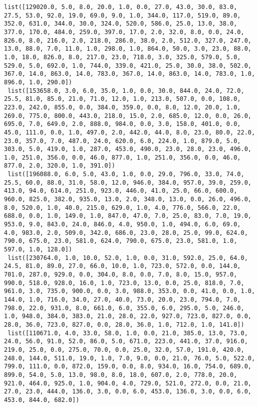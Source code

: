 \documentclass[11pt]{article}
\begin{document}
\begin{Verbatim}[commandchars=\\\{\}]
 list([129020.0, 5.0, 8.0, 20.0, 1.0, 0.0, 27.0, 43.0, 30.0, 83.0, 27.5, 53.0, 92.0, 19.0, 69.0, 9.0, 1.0, 344.0, 117.0, 519.0, 89.0, 352.0, 631.0, 344.0, 30.0, 324.0, 520.0, 586.0, 25.0, 13.0, 38.0, 377.0, 170.0, 484.0, 259.0, 397.0, 17.0, 2.0, 32.0, 8.0, 0.0, 24.0, 826.0, 8.0, 216.0, 2.0, 218.0, 286.0, 38.0, 2.0, 512.0, 327.0, 247.0, 13.0, 88.0, 7.0, 11.0, 1.0, 298.0, 1.0, 864.0, 50.0, 3.0, 23.0, 88.0, 1.0, 18.0, 826.0, 8.0, 217.0, 23.0, 718.0, 3.0, 325.0, 579.0, 5.0, 529.0, 5.0, 692.0, 1.0, 744.0, 339.0, 421.0, 25.0, 30.0, 38.0, 502.0, 367.0, 14.0, 863.0, 14.0, 783.0, 367.0, 14.0, 863.0, 14.0, 783.0, 1.0, 896.0, 1.0, 290.0])
 list([153658.0, 3.0, 6.0, 35.0, 1.0, 0.0, 30.0, 844.0, 24.0, 72.0, 25.5, 81.0, 85.0, 21.0, 71.0, 12.0, 1.0, 213.0, 507.0, 0.0, 108.0, 223.0, 242.0, 855.0, 0.0, 384.0, 359.0, 0.0, 8.0, 12.0, 20.0, 1.0, 269.0, 775.0, 800.0, 443.0, 218.0, 15.0, 2.0, 685.0, 12.0, 0.0, 26.0, 695.0, 7.0, 649.0, 2.0, 888.0, 984.0, 0.0, 3.0, 158.0, 401.0, 0.0, 45.0, 111.0, 0.0, 1.0, 497.0, 2.0, 442.0, 44.0, 8.0, 23.0, 80.0, 22.0, 23.0, 357.0, 7.0, 487.0, 24.0, 620.0, 6.0, 224.0, 1.0, 879.0, 5.0, 303.0, 5.0, 419.0, 1.0, 287.0, 453.0, 490.0, 23.0, 28.0, 23.0, 496.0, 1.0, 251.0, 356.0, 0.0, 46.0, 877.0, 1.0, 251.0, 356.0, 0.0, 46.0, 877.0, 2.0, 320.0, 1.0, 391.0])
 list([196088.0, 6.0, 5.0, 43.0, 1.0, 0.0, 29.0, 796.0, 33.0, 74.0, 25.5, 60.0, 88.0, 31.0, 58.0, 12.0, 946.0, 384.0, 957.0, 39.0, 259.0, 413.0, 94.0, 614.0, 251.0, 923.0, 446.0, 41.0, 25.0, 66.0, 600.0, 960.0, 825.0, 382.0, 935.0, 13.0, 2.0, 348.0, 13.0, 0.0, 26.0, 496.0, 8.0, 520.0, 1.0, 40.0, 215.0, 629.0, 1.0, 4.0, 776.0, 566.0, 22.0, 688.0, 0.0, 1.0, 149.0, 1.0, 847.0, 47.0, 7.0, 25.0, 83.0, 7.0, 19.0, 953.0, 9.0, 843.0, 24.0, 846.0, 4.0, 950.0, 1.0, 494.0, 6.0, 69.0, 4.0, 983.0, 2.0, 509.0, 342.0, 686.0, 23.0, 28.0, 25.0, 99.0, 624.0, 790.0, 675.0, 23.0, 581.0, 624.0, 790.0, 675.0, 23.0, 581.0, 1.0, 597.0, 1.0, 128.0])
 list([230764.0, 1.0, 10.0, 52.0, 1.0, 0.0, 31.0, 592.0, 25.0, 64.0, 24.5, 81.0, 89.0, 27.0, 66.0, 10.0, 1.0, 723.0, 572.0, 0.0, 144.0, 701.0, 287.0, 929.0, 0.0, 304.0, 8.0, 0.0, 7.0, 8.0, 15.0, 957.0, 990.0, 518.0, 928.0, 16.0, 1.0, 723.0, 13.0, 0.0, 25.0, 818.0, 7.0, 961.0, 3.0, 735.0, 900.0, 0.0, 3.0, 988.0, 353.0, 0.0, 41.0, 0.0, 1.0, 144.0, 1.0, 716.0, 34.0, 27.0, 40.0, 73.0, 20.0, 23.0, 794.0, 7.0, 798.0, 22.0, 931.0, 8.0, 661.0, 6.0, 355.0, 6.0, 295.0, 5.0, 246.0, 1.0, 948.0, 384.0, 383.0, 21.0, 28.0, 22.0, 927.0, 723.0, 827.0, 0.0, 28.0, 36.0, 723.0, 827.0, 0.0, 28.0, 36.0, 1.0, 712.0, 1.0, 141.0])
 list([110671.0, 4.0, 33.0, 58.0, 1.0, 0.0, 21.0, 385.0, 13.0, 73.0, 24.0, 56.0, 91.0, 52.0, 86.0, 5.0, 671.0, 223.0, 441.0, 37.0, 916.0, 219.0, 25.0, 0.0, 275.0, 70.0, 0.0, 25.0, 32.0, 57.0, 191.0, 420.0, 248.0, 144.0, 511.0, 19.0, 1.0, 7.0, 9.0, 0.0, 21.0, 76.0, 5.0, 522.0, 799.0, 111.0, 0.0, 872.0, 159.0, 0.0, 8.0, 934.0, 16.0, 754.0, 689.0, 899.0, 54.0, 5.0, 13.0, 98.0, 8.0, 18.0, 607.0, 2.0, 778.0, 20.0, 921.0, 464.0, 925.0, 1.0, 904.0, 4.0, 729.0, 521.0, 272.0, 0.0, 21.0, 27.0, 23.0, 444.0, 136.0, 3.0, 0.0, 6.0, 453.0, 136.0, 3.0, 0.0, 6.0, 453.0, 844.0, 682.0])

\end{Verbatim}
\end{document}
